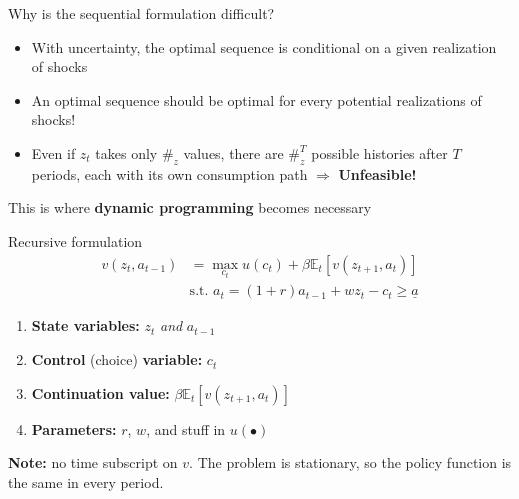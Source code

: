 \documentclass[
  10pt,
  ignorenonframetext,
  aspectratio=43,
  english,
  handout]{beamer}
\providecommand{\tightlist}{%
  \setlength{\itemsep}{0pt}\setlength{\parskip}{0pt}}
\begin{document}
\begin{frame}{Why is the sequential formulation difficult?}
\protect{}\label{why-is-the-sequential-formulation-difficult}
\begin{itemize}
\tightlist
\item
  With uncertainty, the optimal sequence is conditional on a given
  realization of shocks
\item
  An optimal sequence should be optimal for every potential realizations
  of shocks!
\item
  Even if \(z_t\) takes only \(\#_{z}\) values, there are \(\#_{z}^{T}\)
  possible histories after \(T\) periods, each with its own consumption
  path \(\Rightarrow\) \textbf{Unfeasible!}
\end{itemize}

This is where \textbf{dynamic programming} becomes necessary
\end{frame}

\begin{frame}{Recursive formulation}
\protect{}\label{recursive-formulation}
\[
\begin{aligned}
v(z_{t},a_{t-1}) & =\max_{c_{t}}u(c_{t})+\beta\mathbb{E}_{t}\left[v(z_{t+1},a_{t})\right]\\
& \text{s.t. }a_{t}=(1+r)a_{t-1}+wz_{t}-c_{t}\geq\underline{a}
\end{aligned}
\]

\begin{enumerate}
\tightlist
\item
  \textbf{State variables:} \(z_{t}\) \emph{and} \(a_{t-1}\)
\item
  \textbf{Control} (choice) \textbf{variable:} \(c_{t}\)
\item
  \textbf{Continuation value:} \(\beta\mathbb{E}_{t}[v(z_{t+1},a_{t})]\)
\item
  \textbf{Parameters:} \(r\), \(w\), and stuff in \(u(\bullet)\)
\end{enumerate}

\textbf{Note:} no time subscript on \(v\). The problem is stationary, so
the policy function is the same in every period.
\end{frame}
\end{document}

